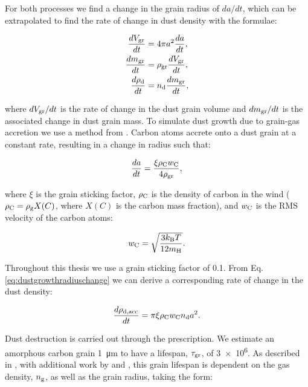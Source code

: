 For both processes we find a change in the grain radius of $da/dt$, which can be extrapolated to find the rate of change in dust density with the formulae:

\begin{subequations}
  \begin{align}
    \frac{dV_\text{gr}}{dt} & = 4 \pi a^2 \frac{da}{dt} ,\\
    \frac{dm_\text{gr}}{dt} & = \rho_\text{gr} \frac{dV_\text{gr}}{dt} ,\\
    \frac{d\rho_\text{d}}{dt}   & = n_\text{d} \frac{dm_\text{gr}}{dt} ,
  \end{align}
\end{subequations}

\noindent
where $dV_\text{gr}/dt$ is the rate of change in the dust grain volume and $dm_\text{gr}/dt$ is the associated change in dust grain mass.
To simulate dust growth due to grain-gas accretion we use a method from \textcite[Ch.~9]{spitzerPhysicalProcessesInterstellar2008}.
Carbon atoms accrete onto a dust grain at a constant rate, resulting in a change in radius such that:

\begin{equation}
  \label{eq:dustgrowthradiuschange}
  \frac{da}{dt} = \frac{\xi \rho_\text{C} w_\text{C}}{4\rho_\text{gr}} ,
\end{equation}

\noindent
where $\xi$ is the grain sticking factor, $\rho_\text{C}$ is the density of carbon in the wind ($\rho_\text{C} = \rho_\text{g} X(C)$, where $X(C)$ is the carbon mass fraction), and $w_\text{C}$ is the RMS velocity of the carbon atoms:

\begin{equation}
  \label{eq:rmsvelocitycarbon}
  w_\text{C} = \sqrt{\frac{3k_\text{B}T}{12 m_\text{H}}} .
\end{equation}

Throughout this thesis we use a grain sticking factor of 0.1.
From Eq. \ref{eq:dustgrowthradiuschange} we can derive a corresponding rate of change in the dust density:

\begin{equation}
  \label{eq:dustgrowthratemodel}
  \frac{d \rho_\text{d,acc}}{dt} = \pi \xi \rho_\text{C} w_\text{C} n_\text{d} a^2.
\end{equation}

\noindent
Dust destruction is carried out through the \textcite{draineDestructionMechanismsInterstellar1979} prescription.
We estimate an amorphous carbon grain \SI{1}{\micro\metre} to have a lifespan, $\tau_\text{gr}$, of \SI{3e6}{\year}.
As described in \textcite{draineDestructionMechanismsInterstellar1979}, with additional work by \textcite{tielens_physics_1994} and \textcite{dwekCoolingSputteringInfrared1996}, this grain lifespan is dependent on the gas density, $n_\text{g}$, as well as the grain radius, taking the form:

